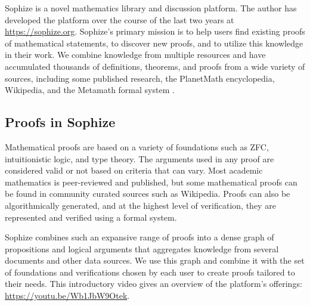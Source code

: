 \documentclass[]{ceurart}
\begin{document}
Sophize is a novel mathematics library and discussion platform. The author has developed the platform over the course of the last two years at \url{https://sophize.org}. Sophize's primary mission is to help users find existing proofs of mathematical statements, to discover new proofs, and to utilize this knowledge in their work. We combine knowledge from multiple resources and have accumulated thousands of definitions, theorems, and proofs from a wide variety of sources, including some published research, the PlanetMath encyclopedia, Wikipedia, and the Metamath formal system \cite{metamath}.

\subsection*{Proofs in Sophize}

Mathematical proofs are based on a variety of foundations such as ZFC, intuitionistic logic, and type theory. The arguments used in any proof are considered valid or not based on criteria that can vary. Most academic mathematics is peer-reviewed and published, but some mathematical proofs can be found in community curated sources such as Wikipedia. Proofs can also be algorithmically generated, and at the highest level of verification, they are represented and verified using a formal system. 

Sophize combines such an expansive range of proofs into a dense graph of propositions and logical arguments that aggregates knowledge from several documents and other data sources. We use this graph and combine it with the set of foundations and verifications chosen by each user to create proofs tailored to their needs. This introductory video gives an overview of the platform's offerings: \url{https://youtu.be/Wb1JbW9Otek}.
\end{document}

